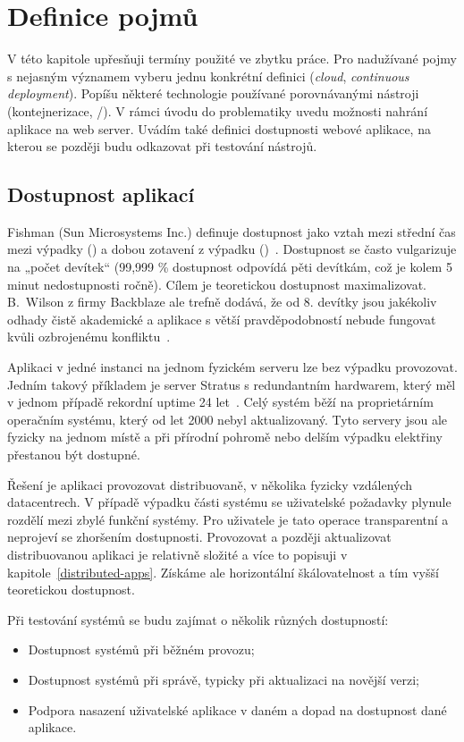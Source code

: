 \chapter{Definice pojmů}
    V této kapitole upřesňuji termíny použité ve zbytku práce. Pro nadužívané pojmy s nejasným významem vyberu jednu konkrétní definici (\textit{cloud}, \textit{continuous deployment}). Popíšu některé technologie používané porovnávanými \CI nástroji (kontejnerizace, /). V rámci úvodu do problematiky \CICD uvedu možnosti nahrání aplikace na web server. Uvádím také definici dostupnosti webové aplikace, na kterou se později budu odkazovat při testování \CICD nástrojů.

    \section*{Dostupnost aplikací}
        Fishman (Sun Microsystems Inc.) definuje dostupnost jako vztah mezi střední čas mezi výpadky () a dobou zotavení z výpadku ()~\cite{fishman-availability}. Dostupnost se často vulgarizuje na „počet devítek“ (99,999 \% dostupnost odpovídá pěti devítkám, což je kolem 5 minut nedostupnosti ročně). Cílem je teoretickou dostupnost maximalizovat. B.~Wilson z firmy Backblaze ale trefně dodává, že od 8. devítky jsou jakékoliv odhady čistě akademické a aplikace s větší pravděpodobností nebude fungovat kvůli ozbrojenému konfliktu~\cite{backblaze-availability}.

        Aplikaci v jedné instanci na jednom fyzickém serveru lze bez výpadku provozovat. Jedním takový příkladem je server Stratus s redundantním hardwarem, který měl v jednom případě rekordní uptime 24 let~\cite{thibodeau-longest-uptime}. Celý systém běží na proprietárním operačním systému, který od let 2000 nebyl aktualizovaný. Tyto servery jsou ale fyzicky na jednom místě a při přírodní pohromě nebo delším výpadku elektřiny přestanou být dostupné.

        Řešení je aplikaci provozovat distribuovaně, v několika fyzicky vzdálených datacentrech. V případě výpadku části systému se uživatelské požadavky plynule rozdělí mezi zbylé funkční systémy. Pro uživatele je tato operace transparentní a neprojeví se zhoršením dostupnosti. Provozovat a později aktualizovat distribuovanou aplikaci je relativně složité a více to popisuji v kapitole~\ref{distributed-apps}. Získáme ale horizontální škálovatelnost a tím vyšší teoretickou dostupnost.

        Při testování \CICD systémů se budu zajímat o několik různých dostupností:
        \begin{itemize}
            \item Dostupnost \CICD systémů při běžném provozu;
            \item Dostupnost \CICD systémů při správě, typicky při aktualizaci na novější verzi;
            \item Podpora nasazení uživatelské aplikace v daném \CICD a dopad na dostupnost dané aplikace.
        \end{itemize}

